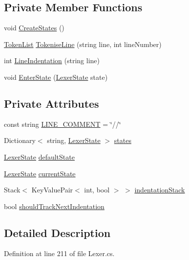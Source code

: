 \subsection*{Private Member Functions}
\begin{DoxyCompactItemize}
\item 
void \hyperlink{a00117_a646081a52b241abaafe5e0cfaeafd751}{Create\-States} ()
\item 
\hyperlink{a00165}{Token\-List} \hyperlink{a00117_a20b63f6ef434f6a40fd388f262f03fa8}{Tokenise\-Line} (string line, int line\-Number)
\item 
int \hyperlink{a00117_a4079b10b099e5d85f5482f9e7eac4179}{Line\-Indentation} (string line)
\item 
void \hyperlink{a00117_ad3ef08f822b310d9864774b057b96995}{Enter\-State} (\hyperlink{a00118}{Lexer\-State} state)
\end{DoxyCompactItemize}
\subsection*{Private Attributes}
\begin{DoxyCompactItemize}
\item 
const string \hyperlink{a00117_a29c457125cc4876f8571f5d9afa372e2}{L\-I\-N\-E\-\_\-\-C\-O\-M\-M\-E\-N\-T} = \char`\"{}//\char`\"{}
\item 
Dictionary$<$ string, \hyperlink{a00118}{Lexer\-State} $>$ \hyperlink{a00117_a2c65c0ba90f973e459583badefef216a}{states}
\item 
\hyperlink{a00118}{Lexer\-State} \hyperlink{a00117_a16b5dbf27a377cde5e8ba0eaa05b5710}{default\-State}
\item 
\hyperlink{a00118}{Lexer\-State} \hyperlink{a00117_ac90b7dce8103425a148f9e8588f14137}{current\-State}
\item 
Stack$<$ Key\-Value\-Pair$<$ int, bool $>$ $>$ \hyperlink{a00117_a6631a1b1a9109258ab18927e7587ff9b}{indentation\-Stack}
\item 
bool \hyperlink{a00117_ac670aac2245cbd4694dfbd5b69313218}{should\-Track\-Next\-Indentation}
\end{DoxyCompactItemize}


\subsection{Detailed Description}


Definition at line 211 of file Lexer.\-cs.




